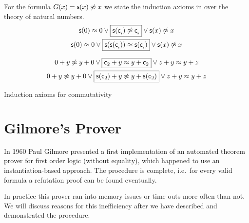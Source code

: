 \begin{example} For the formula $G(x)={\mathsf s}(x)\not\approx x$ we state the induction axioms in \CNF over the theory of natural numbers.
	\begin{gather*}
	{\mathsf s}(0)\approx 0 \lor \boxed{{\mathsf s}({\mathsf c}_{_{\mathsf s}})\not\approx {\mathsf c}_{_{\mathsf s}}} \lor {\mathsf s}(x)\not\approx x \\
	{\mathsf s}(0)\approx 0 \lor \boxed{{\mathsf s}({\mathsf s}({\mathsf c}_{_{\mathsf s}}))\approx {\mathsf s}({\mathsf c}_{_{\mathsf s}})} \lor {\mathsf s}(x)\not\approx x
	\end{gather*}
\end{example}


\begin{table}[hbt]	
	\begin{gather*}
	{0+y\not\approx y+0} 
	\lor\boxed{{\mathsf c}_2+y\approx y+{\mathsf c}_2} 
	\lor{z+y\approx y+z} 
	\\
	0+y\not\approx y+0 \lor 
	\boxed{{\mathsf s}({\mathsf c}_2)+y\not\approx y+{\mathsf s}({\mathsf c}_2)} 
	\lor z+y\approx y+z
	\end{gather*}
	\caption{Induction axioms for commutativity}
	\label{tab:presburger:induction:commutativity}
\end{table}

\section{Gilmore's Prover}\label{sec:gilmore:prover}

In 1960 Paul Gilmore presented a first {\myem implementation} of an automated 
theorem prover \cite{5392528} for first order logic (without equality),
which happened to use an instantiation-based approach. 
The procedure is complete, i.e.~for every valid formula 
a refutation proof can be found eventually.

In practice this prover ran into memory issues or time outs more often than not.
We will discuss reasons for this inefficiency after we have described and demonstrated the procedure.

